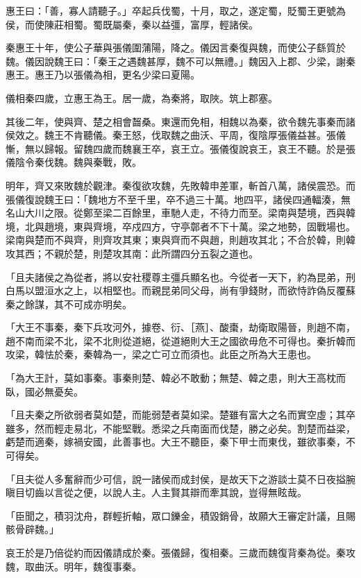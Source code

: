 \begin{pinyinscope}
惠王曰：「善，寡人請聽子。」卒起兵伐蜀，十月，取之，遂定蜀，貶蜀王更號為侯，而使陳莊相蜀。蜀既屬秦，秦以益彊，富厚，輕諸侯。

秦惠王十年，使公子華與張儀圍蒲陽，降之。儀因言秦復與魏，而使公子繇質於魏。儀因說魏王曰：「秦王之遇魏甚厚，魏不可以無禮。」魏因入上郡、少梁，謝秦惠王。惠王乃以張儀為相，更名少梁曰夏陽。

儀相秦四歲，立惠王為王。居一歲，為秦將，取陜。筑上郡塞。

其後二年，使與齊、楚之相會齧桑。東還而免相，相魏以為秦，欲令魏先事秦而諸侯效之。魏王不肯聽儀。秦王怒，伐取魏之曲沃、平周，復陰厚張儀益甚。張儀慚，無以歸報。留魏四歲而魏襄王卒，哀王立。張儀復說哀王，哀王不聽。於是張儀陰令秦伐魏。魏與秦戰，敗。

明年，齊又來敗魏於觀津。秦復欲攻魏，先敗韓申差軍，斬首八萬，諸侯震恐。而張儀復說魏王曰：「魏地方不至千里，卒不過三十萬。地四平，諸侯四通輻湊，無名山大川之限。從鄭至梁二百餘里，車馳人走，不待力而至。梁南與楚境，西與韓境，北與趙境，東與齊境，卒戍四方，守亭鄣者不下十萬。梁之地勢，固戰場也。梁南與楚而不與齊，則齊攻其東；東與齊而不與趙，則趙攻其北；不合於韓，則韓攻其西；不親於楚，則楚攻其南：此所謂四分五裂之道也。

「且夫諸侯之為從者，將以安社稷尊主彊兵顯名也。今從者一天下，約為昆弟，刑白馬以盟洹水之上，以相堅也。而親昆弟同父母，尚有爭錢財，而欲恃詐偽反覆蘇秦之餘謀，其不可成亦明矣。

「大王不事秦，秦下兵攻河外，據卷、衍、［燕］、酸棗，劫衛取陽晉，則趙不南，趙不南而梁不北，梁不北則從道絕，從道絕則大王之國欲毋危不可得也。秦折韓而攻梁，韓怯於秦，秦韓為一，梁之亡可立而須也。此臣之所為大王患也。

「為大王計，莫如事秦。事秦則楚、韓必不敢動；無楚、韓之患，則大王高枕而臥，國必無憂矣。

「且夫秦之所欲弱者莫如楚，而能弱楚者莫如梁。楚雖有富大之名而實空虛；其卒雖多，然而輕走易北，不能堅戰。悉梁之兵南面而伐楚，勝之必矣。割楚而益梁，虧楚而適秦，嫁禍安國，此善事也。大王不聽臣，秦下甲士而東伐，雖欲事秦，不可得矣。

「且夫從人多奮辭而少可信，說一諸侯而成封侯，是故天下之游談士莫不日夜搤腕瞋目切齒以言從之便，以說人主。人主賢其辯而牽其說，豈得無眩哉。

「臣聞之，積羽沈舟，群輕折軸，眾口鑠金，積毀銷骨，故願大王審定計議，且賜骸骨辟魏。」

哀王於是乃倍從約而因儀請成於秦。張儀歸，復相秦。三歲而魏復背秦為從。秦攻魏，取曲沃。明年，魏復事秦。


\end{pinyinscope}
